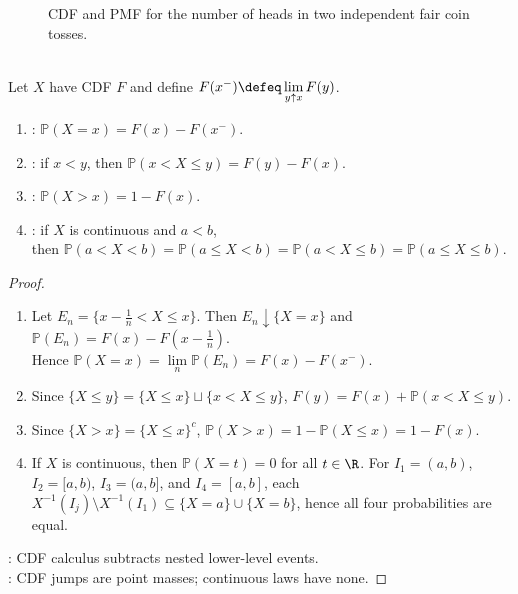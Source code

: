 \begin{figure}[H]
  \centering
  
  \caption{CDF and PMF for the number of heads in two independent fair coin tosses.}
  \label{fig:coin-count-cdf-pmf}
\end{figure}

\begin{proposition} \label{prop:cdf-probability-calculus} \\
Let $X$ have CDF $F$ and define $F(x^-)\defeq\lim\limits_{y\uparrow x}F(y)$.
\begin{enumerate}[label=(\roman*)]
\setlength{\itemsep}{0pt}
\item {}: $\mathbb{P}(X=x)=F(x)-F(x^-)$.
\item {}: if $x<y$, then $\mathbb{P}(x<X\leq y)=F(y)-F(x)$.
\item {}: $\mathbb{P}(X>x)=1-F(x)$.
\item {}: if $X$ is continuous and $a<b$,\\
then $\mathbb{P}(a<X<b)=\mathbb{P}(a\leq X<b)=\mathbb{P}(a<X\leq b)=\mathbb{P}(a\leq X\leq b)$.
\end{enumerate}
\begin{proof}
\begin{enumerate}[label=(\roman*)]
\setlength{\itemsep}{0pt}
\item Let $E_n=\{x-\frac{1}{n}<X\leq x\}$. Then $E_n\downarrow\{X=x\}$ and $\mathbb{P}(E_n)=F(x)-F(x-\frac{1}{n})$.\\
Hence $\mathbb{P}(X=x)=\lim\limits_n\mathbb{P}(E_n)=F(x)-F(x^-)$.
\item Since $\{X\leq y\}=\{X\leq x\}\sqcup\{x<X\leq y\}$, $F(y)=F(x)+\mathbb{P}(x<X\leq y)$.
\item Since $\{X>x\}=\{X\leq x\}^c$, $\mathbb{P}(X>x)=1-\mathbb{P}(X\leq x)=1-F(x)$.
\item If $X$ is continuous, then $\mathbb{P}(X=t)=0$ for all $t\in\R$. For $I_1=(a,b)$, $I_2=[a,b)$, $I_3=(a,b]$, and $I_4=[a,b]$, each $X^{-1}(I_j)\setminus X^{-1}(I_1)\subseteq\{X=a\}\cup\{X=b\}$, hence all four probabilities are equal.
\end{enumerate}
: CDF calculus subtracts nested lower-level events.\\
: CDF jumps are point masses; continuous laws have none.
\end{proof}
\end{proposition}

